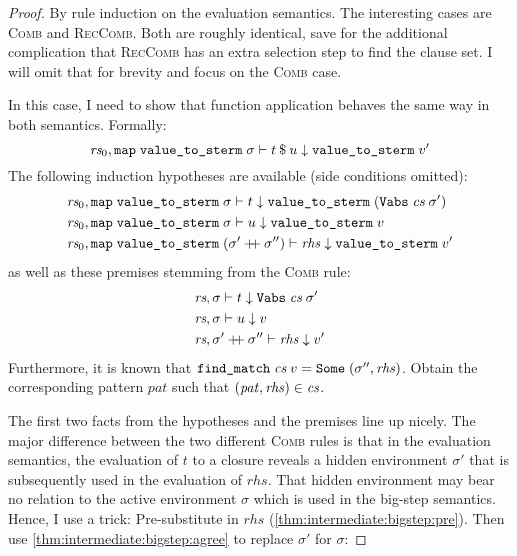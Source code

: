 \begin{proof}
  By rule induction on the evaluation semantics.
  The interesting cases are \textsc{Comb} and \textsc{RecComb}.
  Both are roughly identical, save for the additional complication that \textsc{RecComb} has an extra selection step to find the clause set.
  I will omit that for brevity and focus on the \textsc{Comb} case.

  In this case, I need to show that function application behaves the same way in both semantics.
  Formally:
    \[ \textit{rs}_0, \texttt{\textup{map}}\;\texttt{\textup{value\_to\_sterm}}\;\sigma \vdash t\mathbin{\$}u \downarrow \texttt{\textup{value\_to\_sterm}}\;v' \]
  The following induction hypotheses are available (side conditions omitted):
  \begin{align*}
    &\textit{rs}_0, \texttt{\textup{map}}\;\texttt{\textup{value\_to\_sterm}}\;\sigma \vdash t \downarrow \texttt{\textup{value\_to\_sterm}}\;(\texttt{\textup{Vabs}}\;\textit{cs}\;\sigma') \\
    &\textit{rs}_0, \texttt{\textup{map}}\;\texttt{\textup{value\_to\_sterm}}\;\sigma \vdash u \downarrow \texttt{\textup{value\_to\_sterm}}\;v \\
    &\textit{rs}_0, \texttt{\textup{map}}\;\texttt{\textup{value\_to\_sterm}}\;(\sigma' \mathbin{+\!\!+} \sigma'') \vdash \mathit{rhs} \downarrow \texttt{\textup{value\_to\_sterm}}\;v'
  \end{align*}
  as well as these premises stemming from the \textsc{Comb} rule:
  \begin{align*}
    &\textit{rs}, \sigma \vdash t \downarrow \texttt{\textup{Vabs}}\;\textit{cs}\;\sigma' \\
    &\textit{rs}, \sigma \vdash u \downarrow v \\
    &\textit{rs}, \sigma' \mathbin{+\!\!+} \sigma'' \vdash \mathit{rhs} \downarrow v'
  \end{align*}
  Furthermore, it is known that $\texttt{\textup{find\_match}}\;\textit{cs}\;v = \texttt{\textup{Some}}\;(\sigma'', \mathit{rhs})$.
  Obtain the corresponding pattern $\mathit{pat}$ such that $(\mathit{pat}, \mathit{rhs}) \in \textit{cs}$.

  The first two facts from the hypotheses and the premises line up nicely.
  The major difference between the two different \textsc{Comb} rules is that in the evaluation semantics, the evaluation of $t$ to a closure reveals a hidden environment $\sigma'$ that is subsequently used in the evaluation of $\mathit{rhs}$.
  That hidden environment may bear no relation to the active environment $\sigma$ which is used in the big-step semantics.
  Hence, I use a trick:
  Pre-substitute in $\mathit{rhs}$ (\cref{thm:intermediate:bigstep:pre}).
  Then use \cref{thm:intermediate:bigstep:agree} to replace $\sigma'$ for $\sigma$:


\end{proof}
